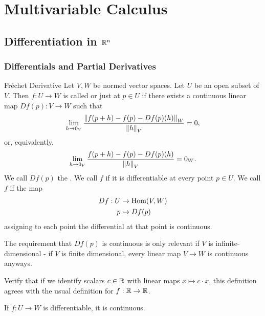 \part{Multivariable Calculus}
\chapter{Differentiation in $\mathbb{R}^n$}
\section{Differentials and Partial Derivatives}
\begin{importantdefinition}{Fréchet Derivative}{}
	Let $V,W$ be normed vector spaces. Let $U$ be an open subset of $V$. Then $f : U \to W$ is called  or just  at $p \in U$ if there exists a continuous linear map $Df(p) : V \to W$ such that
	\begin{align*}
		\lim_{h \to 0_V} \frac{\norm{f(p+h) - f(p) - Df(p)(h)}_W}{\norm{h}_V} = 0,
	\end{align*}
	or, equivalently,
	\begin{align*}
		\lim_{h \to 0_V} \frac{f(p+h) - f(p) - Df(p)(h)}{\norm{h}_V} = 0_W.
	\end{align*}
	We call $Df(p)$ the . We call $f$  if it is differentiable at every point $p \in U$. We call $f$  if the map
	\begin{align*}
		Df : U &\to \textnormal{Hom}(V,W)\\
		p &\mapsto Df(p)
	\end{align*} 
	assigning to each point the differential at that point is continuous. 
\end{importantdefinition}
The requirement that $Df(p)$ is continuous is only relevant if $V$ is infinite-dimensional - if $V$ is finite dimensional, every linear map $V \to W$ is continuous anyways.
\begin{exercise}
	Verify that if we identify scalars $c \in \mathbb{R}$ with linear maps $x \mapsto c \cdot x$, this definition agrees with the usual definition for $f : \mathbb{R} \to \mathbb{R}$.
\end{exercise}
\begin{theorem}
	If $f : U \to W$ is differentiable, it is continuous.
\end{theorem}
